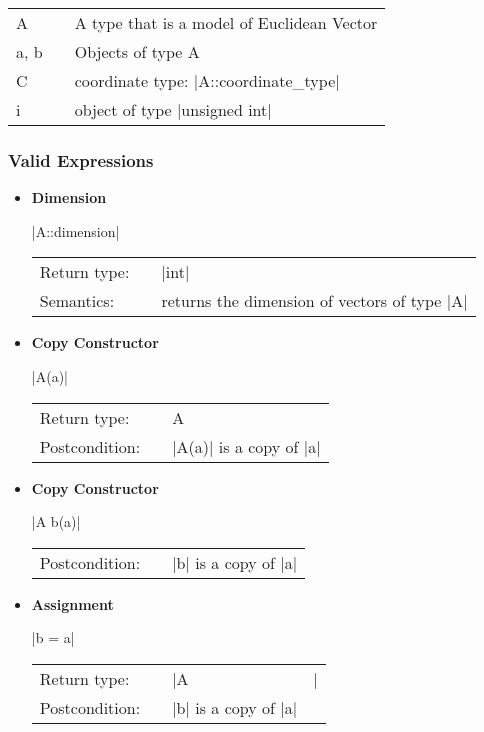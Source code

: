 \documentclass[12pt,twoside]{report}
\begin{document}
\begin{tabular}[!h]{l l l}
A & & A type that is a model of Euclidean Vector\\
a, b & & Objects of type A\\
C & &  coordinate type: |A::coordinate_type|\\
i & & object of type |unsigned int|\\
\end{tabular}


\htmlrule[CLEAR=all]  \subsubsection*{Valid Expressions}

\begin{itemize}

\item {\bf Dimension}

  |A::dimension|

  \begin{tabular}[!h]{l p{1cm} p{10cm}}
    Return type: & & |int|\\
    Semantics: & & returns the dimension of vectors of type |A|\\
  \end{tabular}



\item {\bf Copy Constructor}

  |A(a)|

  \begin{tabular}[!h]{l p{1cm} p{10cm}}
    Return type: & & A\\
    Postcondition: & & |A(a)| is a copy of |a|\\
  \end{tabular}

\item {\bf Copy Constructor}

  |A b(a)|

  \begin{tabular}[!h]{l p{1cm} p{10cm}}
    Postcondition: & & |b| is a copy of |a|\\
  \end{tabular}

\item {\bf Assignment}

  |b = a|

  \begin{tabular}[!h]{l p{1cm} p{10cm}}
    Return type: & & |A&|\\
    Postcondition: & & |b| is a copy of |a|\\
  \end{tabular}



\end{itemize}
\end{document}
